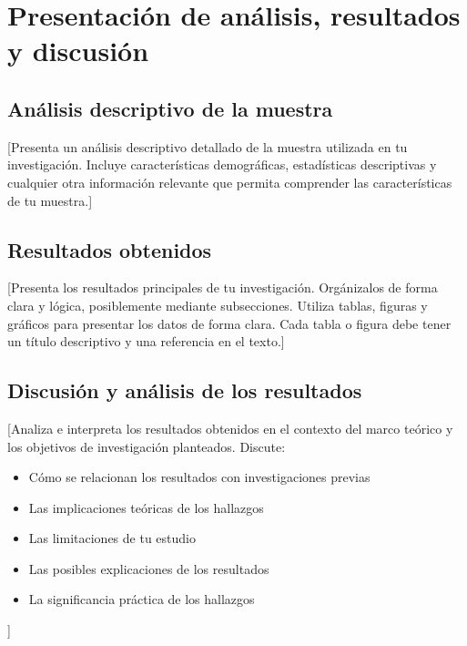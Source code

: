 \chapter{Presentación de análisis, resultados y discusión}

\section{Análisis descriptivo de la muestra}

[Presenta un análisis descriptivo detallado de la muestra utilizada en tu investigación.
Incluye características demográficas, estadísticas descriptivas y cualquier otra información
relevante que permita comprender las características de tu muestra.]

\section{Resultados obtenidos}

[Presenta los resultados principales de tu investigación. Orgánizalos de forma clara y lógica,
posiblemente mediante subsecciones. Utiliza tablas, figuras y gráficos para presentar los datos
de forma clara. Cada tabla o figura debe tener un título descriptivo y una referencia en el texto.]

\section{Discusión y análisis de los resultados}

[Analiza e interpreta los resultados obtenidos en el contexto del marco teórico y los objetivos
de investigación planteados. Discute:

\begin{itemize}
    \item Cómo se relacionan los resultados con investigaciones previas
    \item Las implicaciones teóricas de los hallazgos
    \item Las limitaciones de tu estudio
    \item Las posibles explicaciones de los resultados
    \item La significancia práctica de los hallazgos
\end{itemize}
]

